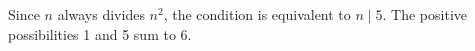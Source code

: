 Since $n$ always divides $n^2$, the condition is equivalent to $n\mid5$. The positive possibilities 1 and 5 sum to $\boxed6$.
